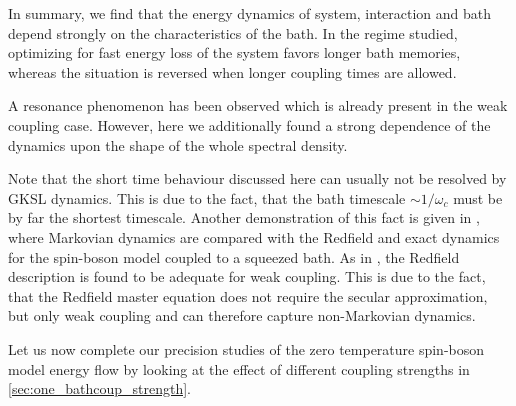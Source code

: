In summary, we find that the energy dynamics of system, interaction and
bath depend strongly on the characteristics of the bath.  In the
regime studied, optimizing for fast energy loss of the system favors
longer bath memories, whereas the situation is reversed when longer
coupling times are allowed.

A resonance phenomenon has been observed which is already present in
the weak coupling case. However, here we additionally found a strong
dependence of the dynamics upon the shape of the whole spectral
density.

Note that the short time behaviour discussed here can usually not be
resolved by GKSL dynamics. This is due to the fact, that the bath
timescale \(\sim 1/ω_{c}\) must be by far the shortest
timescale. Another demonstration of this fact is given in
\cite{Link2022Feb}, where Markovian dynamics are compared with the
Redfield and exact dynamics for the spin-boson model coupled to a
squeezed bath. As in \cite{Xu2022Mar}, the Redfield description is
found to be adequate for weak coupling. This is due to the fact, that
the Redfield master equation does not require the secular
approximation, but only weak coupling and can therefore capture
non-Markovian dynamics.

Let us now complete our precision studies of the zero temperature
spin-boson model energy flow by looking at the effect of different
coupling strengths in \cref{sec:one_bathcoup_strength}.

